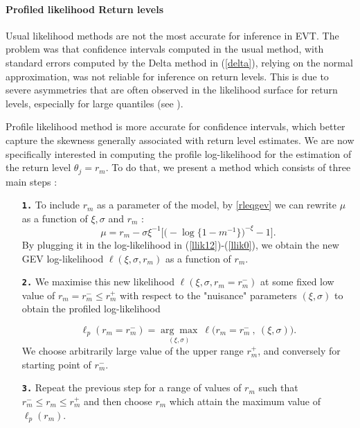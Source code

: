 \paragraph*{Profiled likelihood Return levels}

Usual likelihood methods are not the most accurate for inference in EVT. The problem was that confidence intervals computed in the usual method, with standard 
errors computed by the Delta method in (\ref{delta}), relying on the normal approximation, was not reliable for inference on return levels.
 This is due to severe asymmetries that are often observed in the likelihood surface for return levels, especially for large quantiles (see \cite{bolivar_profile_2010}).

Profile likelihood method is more accurate for confidence intervals, which better capture the skewness generally associated with return level estimates.
 We are now specifically interested in computing the profile log-likelihood
for the estimation of the return level $\theta_j=r_m$. To do that, we present a method which consists of three main steps :

\begin{enumerate}[label=\textbf{\arabic*})]
	
	\item[\textbf{\texttt{1.}}]  To include $r_m$ as a parameter of the model, by \ref{rleqgev} we can rewrite $\mu$ as a function of $\xi,\sigma$ and $r_m$ :
	\begin{equation*}
	\mu= r_m-\sigma\xi^{-1}\Big[\Big(-\log\{1-m^{-1}\}\Big)^{-\xi}-1\Big].
	\end{equation*}
	By plugging it in the log-likelihood in (\ref{llik12})-(\ref{llik0}), we obtain the new GEV log-likelihood $\ell(\xi,\sigma,r_m)$ as a function of $r_m$.
	
	\item[\textbf{\texttt{2.}}]   We maximise this new likelihood $\ell (\xi,\sigma,r_m=r^{-}_{m})$ at some fixed low value of $r_m=r^{-}_{m}\leq r^{+}_{m}$ with respect to the "nuisance" parameters $(\xi,\sigma)$ to obtain the profiled log-likelihood
	
	\begin{equation*}
	\ell_p(r_m=r^{-}_{m})=\underset{(\xi,\sigma)}{\mathrm{\arg\max}}\ \ell \Big(r_m=r^{-}_{m}\ ,\ (\xi,\sigma)\Big).
	\end{equation*} 
	We choose arbitrarily large value of the upper range $r^{+}_m$, and conversely for starting point of $r^{-}_m$.
	
	\item[\textbf{\texttt{3.}}]  Repeat the previous step for a range of values of $r_m$ such that $r^{-}_{m}\leq r_m\leq r^{+}_{m}$ and then choose $r_m$ which attain the maximum value of $\ell_p(r_m)$.
\end{enumerate}

